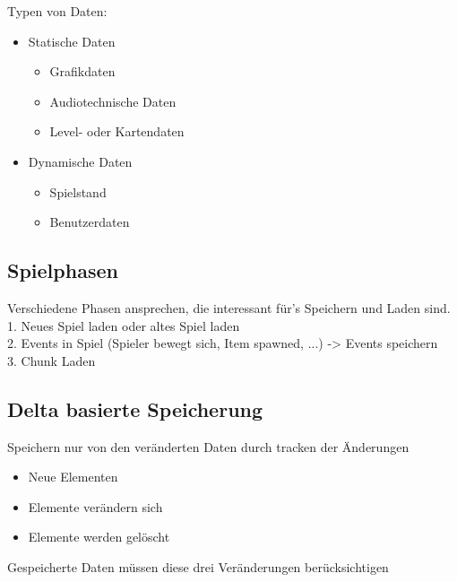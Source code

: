 Typen von Daten:\\
\begin{itemize}
    \item Statische Daten
    \begin{itemize}
        \item Grafikdaten
        \item Audiotechnische Daten
        \item Level- oder Kartendaten
    \end{itemize}
    \item Dynamische Daten
    \begin{itemize}
        \item Spielstand
        \item Benutzerdaten
    \end{itemize}
\end{itemize}


\subsection{Spielphasen}
Verschiedene Phasen ansprechen, die interessant für's Speichern und Laden sind.\\
1. Neues Spiel laden oder altes Spiel laden\\
2. Events in Spiel (Spieler bewegt sich, Item spawned, ...) -> Events speichern\\
3. Chunk Laden 


\subsection{Delta basierte Speicherung}
Speichern nur von den veränderten Daten durch tracken der Änderungen
\begin{itemize}
    \item Neue Elementen
    \item Elemente verändern sich
    \item Elemente werden gelöscht
\end{itemize}
Gespeicherte Daten müssen diese drei Veränderungen berücksichtigen


